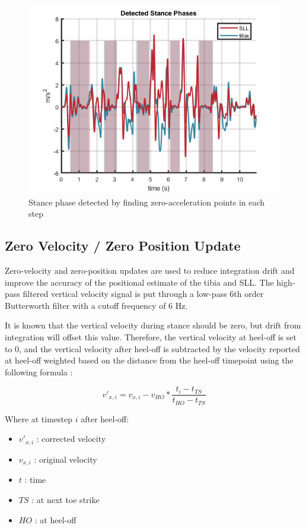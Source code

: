 \documentclass[defaultstyle,11pt]{comps}
\providecommand{\tightlist}{%
  \setlength{\itemsep}{0pt}\setlength{\parskip}{0pt}}
\begin{document}
\begin{figure}
\hypertarget{fig:SA1-Stance}{%
\centering
\includegraphics{../fig/SA1/S3C0T1R_Stance.png}
\caption{Stance phase detected by finding zero-acceleration points in each step}\label{fig:SA1-Stance}
}
\end{figure}

\hypertarget{zero-velocity-zero-position-update}{%
\subsection{Zero Velocity / Zero Position Update}\label{zero-velocity-zero-position-update}}

Zero-velocity and zero-position updates are used to reduce integration drift and improve the accuracy of the positional estimate of the tibia and SLL.
The high-pass filtered vertical velocity signal is put through a low-pass 6th order Butterworth filter with a cutoff frequency of 6 Hz.

It is known that the vertical velocity during stance should be zero, but drift from integration will offset this value.
Therefore, the vertical velocity at heel-off is set to 0, and the vertical velocity after heel-off is subtracted by the velocity reported at heel-off weighted based on the distance from the heel-off timepoint using the following formula \citep{Feliz2009}:

\[
v'_{x,i} = v_{x,i} - v_{HO}*\frac{t_{i}-t_{TS}}{t_{HO}-t_{TS}}
\]

Where at timestep \(i\) after heel-off:

\begin{itemize}
\tightlist
\item
  \(v'_{x,i}\) : corrected velocity
\item
  \(v_{x,i}\) : original velocity
\item
  \(t\) : time
\item
  \(TS\) : at next toe strike
\item
  \(HO\) : at heel-off
\end{itemize}
\end{document}
